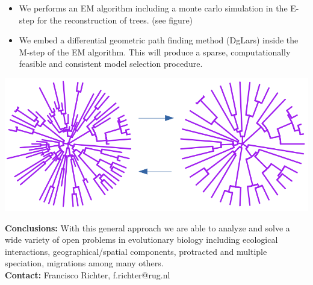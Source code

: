 \documentclass[a0paper,portrait]{baposter}
\begin{document}
\begin{poster}
{\vspace{-0.4cm}
\begin{itemize}
\item %
We performs an EM algorithm including a monte carlo simulation in the E-step for the reconstruction of trees. (see figure)
\vspace{-0.35cm}
\item We embed a differential geometric path finding method (DgLars) inside the M-step of the EM algorithm. This will produce a sparse, computationally feasible and consistent model selection procedure.  
\end{itemize}
\vspace{-0.7cm}
\begin{center}
                \includegraphics[width=0.6\linewidth]{figures/fco.png}
				\end{center}
\vspace{-0.45cm}
\textbf{Conclusions:} With this general approach we are able to analyze and solve a wide variety of open problems in evolutionary biology including ecological interactions, geographical/spatial components, protracted and multiple speciation, migrations among many others.\\  
\textbf{Contact: } Francisco Richter, f.richter@rug.nl
}


\headerbox{Causal effect in network}{name=box1,column=0,row=0, below=box3 , span = 1}{ %


}
\end{poster}
\end{document}
